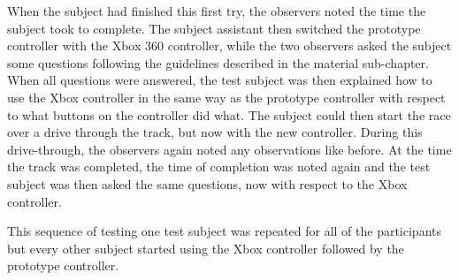 When the subject had finished this first try, the observers noted the time the subject took to complete. 
The subject assistant then switched the prototype controller with the Xbox 360 controller, while the two observers asked the subject some questions following the guidelines described in the material sub-chapter. 
When all questions were answered, the test subject was then explained how to use the Xbox controller in the same way as the prototype controller with respect to what buttons on the controller did what. 
The subject could then start the race over a drive through the track, but now with the new controller. 
During this drive-through, the observers again noted any observations like before. 
At the time the track was completed, the time of completion was noted again and the test subject was then asked the same questions, now with respect to the Xbox controller. 
\bigskip

This sequence of testing one test subject was repeated for all of the participants but every other subject started using the Xbox controller followed by the prototype controller.